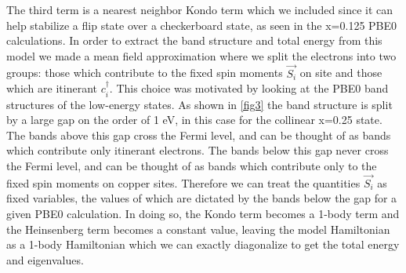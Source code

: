 \documentclass{article}
\begin{document}
The third term is a nearest neighbor Kondo term which we included since it can help stabilize a flip state over a checkerboard state, as seen in the x=0.125 PBE0 calculations. 
In order to extract the band structure and total energy from this model we made a mean field approximation where we split the electrons into two groups: those which contribute to the fixed spin moments $\vec{S_i}$ on site and those which are itinerant $c_i^\dagger$. 
This choice was motivated by looking at the PBE0 band structures of the low-energy states. 
As shown in \ref{fig3} the band structure is split by a large gap on the order of 1 eV, in this case for the collinear x=0.25 state. 
The bands above this gap cross the Fermi level, and can be thought of as bands which contribute only itinerant electrons. 
The bands below this gap never cross the Fermi level, and can be thought of as bands which contribute only to the fixed spin moments on copper sites. 
Therefore we can treat the quantities $\vec{S_i}$ as fixed variables, the values of which are dictated by the bands below the gap for a given PBE0 calculation. 
In doing so, the Kondo term becomes a 1-body term and the Heinsenberg term becomes a constant value, leaving the model Hamiltonian as a 1-body Hamiltonian which we can exactly diagonalize to get the total energy and eigenvalues. 
\end{document}
